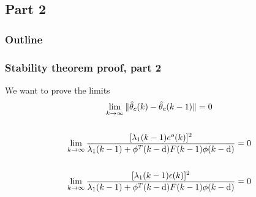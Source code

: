 \subsection{Part 2}
\begin{frame}
    \frametitle{Outline}
    \tableofcontents[currentsection]
\end{frame}

\begin{frame}
    \frametitle{Stability theorem proof, part 2}

    We want to prove the limits
    \begin{gather*}
        \lim_{k \rightarrow \infty} \| \hat{\theta}_c(k) - \hat{\theta}_c(k-1) \| = 0 \\
        \, \\
        \lim_{k \rightarrow \infty} \frac{ [\lambda_1(k-1) e^o(k)]^2 }
            { \lambda_1(k-1) + \phi^T(k-\textrm{d}) F(k-1) \phi(k-\textrm{d}) } = 0 \\
        \, \\
        \lim_{k \rightarrow \infty} \frac{ [\lambda_1(k-1) \epsilon(k)]^2 }
            { \lambda_1(k-1) + \phi^T(k-\textrm{d}) F(k-1) \phi(k-\textrm{d}) } = 0
    \end{gather*}
\end{frame}

